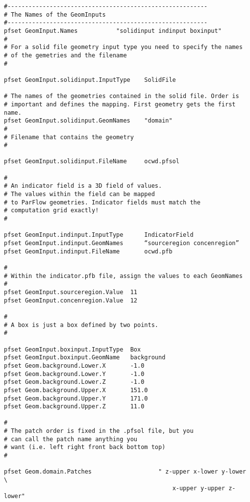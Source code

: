 \begin{display}\begin{verbatim}
#---------------------------------------------------------
# The Names of the GeomInputs
#---------------------------------------------------------
pfset GeomInput.Names 			"solidinput indinput boxinput"
#
# For a solid file geometry input type you need to specify the names
# of the gemetries and the filename
#

pfset GeomInput.solidinput.InputType	SolidFile

# The names of the geometries contained in the solid file. Order is
# important and defines the mapping. First geometry gets the first name. 
pfset GeomInput.solidinput.GeomNames	"domain"
#
# Filename that contains the geometry
#

pfset GeomInput.solidinput.FileName 	ocwd.pfsol

#
# An indicator field is a 3D field of values. 
# The values within the field can be mapped 
# to ParFlow geometries. Indicator fields must match the
# computation grid exactly!
#

pfset GeomInput.indinput.InputType 		IndicatorField
pfset GeomInput.indinput.GeomNames    	“sourceregion concenregion”
pfset GeomInput.indinput.FileName		ocwd.pfb

#
# Within the indicator.pfb file, assign the values to each GeomNames
# 
pfset GeomInput.sourceregion.Value 	11
pfset GeomInput.concenregion.Value 	12

#
# A box is just a box defined by two points.
#

pfset GeomInput.boxinput.InputType	Box
pfset GeomInput.boxinput.GeomName	background
pfset Geom.background.Lower.X 		-1.0
pfset Geom.background.Lower.Y 		-1.0
pfset Geom.background.Lower.Z 		-1.0
pfset Geom.background.Upper.X 		151.0
pfset Geom.background.Upper.Y 		171.0
pfset Geom.background.Upper.Z 		11.0

#
# The patch order is fixed in the .pfsol file, but you 
# can call the patch name anything you 
# want (i.e. left right front back bottom top)
#

pfset Geom.domain.Patches             		" z-upper x-lower y-lower \
                                      			x-upper y-upper z-lower"

\end{verbatim}\end{display}


